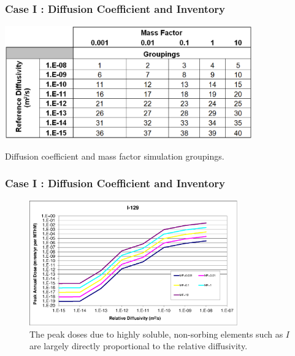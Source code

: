 
\begin{frame}[c]
  \frametitle{Case I : Diffusion Coefficient and Inventory}

\begin{table}[hbp!]
\centering
\includegraphics[width=0.8\textwidth]{DiffCoeffAndInvEBSFail/DiffCoeffAndInvGroups.eps}
\caption{Diffusion coefficient and mass factor simulation groupings.}
\label{tab:DiffCoeffAndInvGroups}
\end{table}
\end{frame}

\begin{frame}[c]
  \frametitle{Case I : Diffusion Coefficient and Inventory}
\begin{figure}[ht]
\centering
\includegraphics[width=0.8\textwidth]{./DiffCoeffAndInvEBSFail/I-129.eps}
\caption{The peak doses due to highly soluble, non-sorbing elements such as $I$ 
are largely directly proportional to the relative diffusivity.  }
\label{fig:DCInvI129}
\end{figure}
\end{frame}

